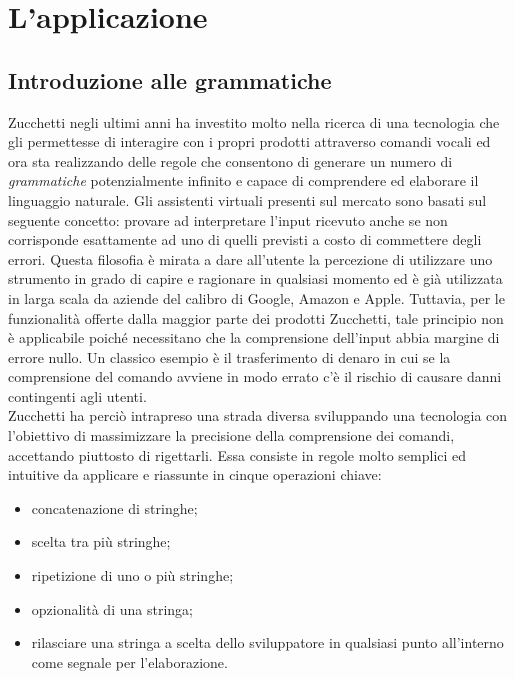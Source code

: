 
\chapter{L'applicazione}
\label{cap:applicazione}


\section{Introduzione alle grammatiche}
Zucchetti negli ultimi anni ha investito molto nella ricerca di una tecnologia che gli permettesse di interagire con i propri prodotti attraverso comandi vocali ed ora sta realizzando delle regole che consentono di generare un numero di \emph{grammatiche} potenzialmente infinito e capace di comprendere ed elaborare il linguaggio naturale.
Gli assistenti virtuali presenti sul mercato sono basati sul seguente concetto: provare ad interpretare l'input ricevuto anche se non corrisponde esattamente ad uno di quelli previsti a costo di commettere degli errori. Questa filosofia è mirata a dare all'utente la percezione di utilizzare uno strumento in grado di capire e ragionare in qualsiasi momento ed è già utilizzata in larga scala da aziende del calibro di Google, Amazon e Apple. Tuttavia, per le funzionalità offerte dalla maggior parte dei prodotti Zucchetti, tale principio non è applicabile poiché necessitano che la comprensione dell'input abbia margine di errore nullo. Un classico esempio è il trasferimento di denaro in cui se la comprensione del comando avviene in modo errato c'è il rischio di causare danni contingenti agli utenti. \\
Zucchetti ha perciò intrapreso una strada diversa sviluppando una tecnologia con l'obiettivo di massimizzare la precisione della comprensione dei comandi, accettando piuttosto di rigettarli. Essa consiste in regole molto semplici ed intuitive da applicare e riassunte in cinque operazioni chiave:
\begin{itemize}
	\item concatenazione di stringhe;
	\item scelta tra più stringhe;
	\item ripetizione di uno o più stringhe;
	\item opzionalità di una stringa;
	\item rilasciare una stringa a scelta dello sviluppatore in qualsiasi punto all'interno come segnale per l'elaborazione.
\end{itemize}
